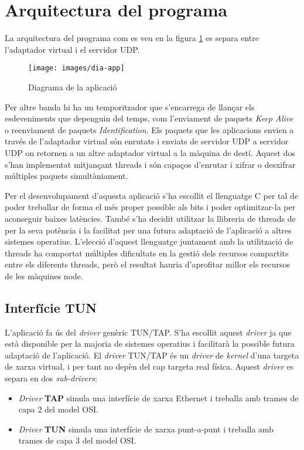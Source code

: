 \section{Arquitectura del programa}
La arquitectura del programa com es veu en la figura \ref{F:dia-app} es separa entre l'adaptador virtual i el servidor UDP.
\begin{figure}[htb]
\centering
\texttt{[image: images/dia-app]}
\caption{Diagrama de la aplicació}
\label{F:dia-app}
\end{figure}
Per altre banda hi ha un temporitzador que s'encarrega de llançar els esdeveniments que depenguin del temps, com l'enviament de paquets \emph{Keep Alive} o reenviament de paquets \emph{Identification}.
Els paquets que les aplicacions envien a través de l'adaptador virtual són enrutats i enviats de servidor UDP a servidor UDP on retornen a un altre adaptador virtual a la màquina de destí. Aquest dos s'han implementat mitjançant threads i són capaços d'enrutar i xifrar o desxifrar múltiples paquets simultàniament.

Per el desenvolupament d'aquesta aplicació s'ha escollit el llenguatge C per tal de poder treballar de forma el més proper possible als bits i poder optimitzar-la per aconseguir baixes latències. També s'ha decidit utilitzar la llibreria de threads de  per la seva potència i la facilitat per una futura adaptació de l'aplicació a altres sistemes operatius. L'elecció d'aquest llenguatge juntament amb la utilització de threads ha comportat múltiples dificultats en la gestió dels recursos compartits entre els diferents threads, però el resultat hauria d'aprofitar millor els recursos de les màquines node.
\subsection{Interfície TUN}
L'aplicació fa ús del \emph{driver} genèric TUN/TAP. S'ha escollit aquest \emph{driver} ja que està disponible per la majoria de sistemes operatius i facilitarà la possible futura adaptació de l'aplicació.
El \emph{driver} TUN/TAP és un \emph{driver} de \emph{kernel} d'una targeta de xarxa virtual, i per tant no depèn del cap targeta real física. Aquest \emph{driver} es separa en dos \emph{sub-drivers}:
\begin{itemize}
\item \emph{Driver} \textbf{TAP} simula una interfície de xarxa Ethernet i treballa amb trames de capa 2 del model OSI.
\item \emph{Driver} \textbf{TUN} simula una interfície de xarxa punt-a-punt i treballa amb trames de capa 3 del model OSI.
\end{itemize}

